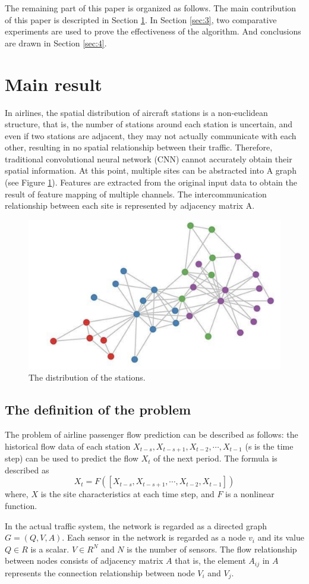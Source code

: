\documentclass[journal,article,submit,moreauthors,pdftex]{Definitions/mdpi}
\begin{document}
\par The remaining part of this paper is organized as follows. The main contribution of  this paper is descripted in Section \ref{sec:2}. In Section \ref{sec:3}, two comparative experiments are used to prove the effectiveness of the algorithm. And conclusions are drawn in Section \ref{sec:4}.


\section{Main result}\label{sec:2}
In airlines, the spatial distribution of aircraft stations is a non-euclidean structure, that is, the number of stations around each station is uncertain, and even if two stations are adjacent, they may not actually communicate with each other, resulting in no spatial relationship between their traffic. Therefore, traditional convolutional neural network (CNN) cannot accurately obtain their spatial information. At this point, multiple sites can be abstracted into A graph (see Figure \ref{fig:stations}). Features are extracted from the original input data to obtain the result of feature mapping of multiple channels. The intercommunication relationship between each site is represented by adjacency matrix A.
\begin{figure}[htp]
    \centering
    \includegraphics[width=8 cm]{imgs/GCN.png}
    \caption{The distribution of the stations.}
    \label{fig:stations}
\end{figure}
\subsection{The definition of the problem} 
The problem of airline passenger flow prediction can be described as follows: the historical flow data of each station $X_{t-s}, X_{t-s+1},  X_{t-2}, \cdots,  X_{t-1}$ (s is the time step) can be used to predict the flow $X_{t}$ of the next period. 
The formula is described as
\begin{equation}
    X_{t} = F([ X_{t-s}, X_{t-s+1}, \cdots, X_{t-2}, X_{t-1}])
\end{equation}
where, $X$ is the site characteristics at each time step, and $F$ is a nonlinear function.
\par In the actual traffic system, the network is regarded as a directed graph $G = (Q, V, A)$. Each sensor in the  network is regarded as a node $v_{i}$ and its value $Q \in R$ is a scalar. $V \in R^{N}$ and $N$ is the number of sensors. 
The flow relationship between nodes consists of adjacency matrix $A$ that is, the element $A_{ij}$ in $A$ represents the connection relationship between node $V_{i}$ and $V_{j}$.
\end{document}
